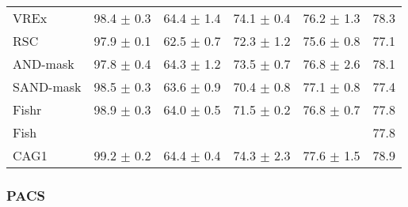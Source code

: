 \documentclass{article}
\begin{document}
\begin{center}
{\begin{tabular}{lccccc}
VREx                 & 98.4 $\pm$ 0.3       & 64.4 $\pm$ 1.4       & 74.1 $\pm$ 0.4       & 76.2 $\pm$ 1.3       & 78.3                 \\
RSC                  & 97.9 $\pm$ 0.1       & 62.5 $\pm$ 0.7       & 72.3 $\pm$ 1.2       & 75.6 $\pm$ 0.8       & 77.1                 \\
AND-mask             & 97.8 $\pm$ 0.4       & 64.3 $\pm$ 1.2       & 73.5 $\pm$ 0.7       & 76.8 $\pm$ 2.6       & 78.1                 \\
SAND-mask            & 98.5 $\pm$ 0.3       & 63.6 $\pm$ 0.9       & 70.4 $\pm$ 0.8       & 77.1 $\pm$ 0.8       & 77.4                 \\
Fishr                & 98.9 $\pm$ 0.3       & 64.0 $\pm$ 0.5       & 71.5 $\pm$ 0.2       & 76.8 $\pm$ 0.7       & 77.8                 \\
Fish                 &                      &                      &                      &                      & 77.8                 \\
\midrule
CAG1                 & 99.2 $\pm$ 0.2       & 64.4 $\pm$ 0.4       & 74.3 $\pm$ 2.3       & 77.6 $\pm$ 1.5       & 78.9                 \\
\bottomrule
\end{tabular}}
\end{center}

\subsubsection{PACS}
\end{document}

